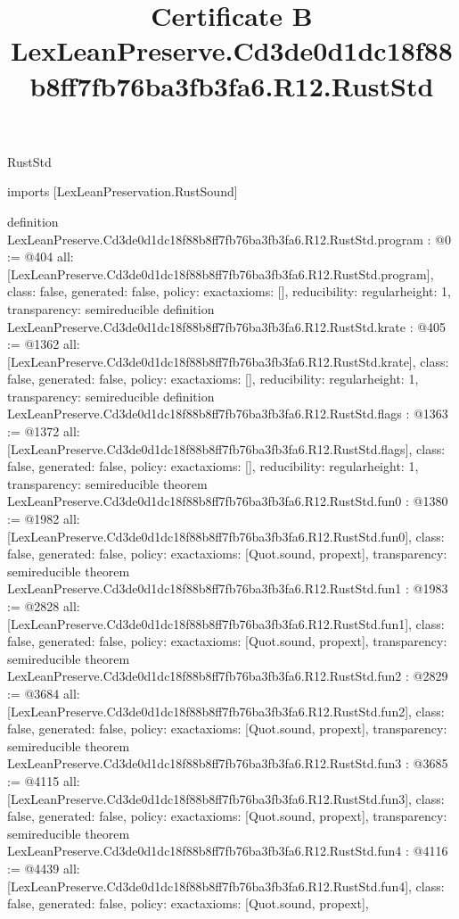 \begin{lexlean}{RustStd}
\title{Certificate B LexLeanPreserve.Cd3de0d1dc18f88b8ff7fb76ba3fb3fa6.R12.RustStd}
\begin{coremodule}
imports [LexLeanPreservation.RustSound]

definition LexLeanPreserve.Cd3de0d1dc18f88b8ff7fb76ba3fb3fa6.R12.RustStd.program : @0 := @404 {
  all: [LexLeanPreserve.Cd3de0d1dc18f88b8ff7fb76ba3fb3fa6.R12.RustStd.program],
  class: false,
  generated: false,
  policy: exact{axioms: []},
  reducibility: regular{height: 1},
  transparency: semireducible
}
definition LexLeanPreserve.Cd3de0d1dc18f88b8ff7fb76ba3fb3fa6.R12.RustStd.krate : @405 := @1362 {
  all: [LexLeanPreserve.Cd3de0d1dc18f88b8ff7fb76ba3fb3fa6.R12.RustStd.krate],
  class: false,
  generated: false,
  policy: exact{axioms: []},
  reducibility: regular{height: 1},
  transparency: semireducible
}
definition LexLeanPreserve.Cd3de0d1dc18f88b8ff7fb76ba3fb3fa6.R12.RustStd.flags : @1363 := @1372 {
  all: [LexLeanPreserve.Cd3de0d1dc18f88b8ff7fb76ba3fb3fa6.R12.RustStd.flags],
  class: false,
  generated: false,
  policy: exact{axioms: []},
  reducibility: regular{height: 1},
  transparency: semireducible
}
theorem LexLeanPreserve.Cd3de0d1dc18f88b8ff7fb76ba3fb3fa6.R12.RustStd.fun0 : @1380 := @1982 {
  all: [LexLeanPreserve.Cd3de0d1dc18f88b8ff7fb76ba3fb3fa6.R12.RustStd.fun0],
  class: false,
  generated: false,
  policy: exact{axioms: [Quot.sound, propext]},
  transparency: semireducible
}
theorem LexLeanPreserve.Cd3de0d1dc18f88b8ff7fb76ba3fb3fa6.R12.RustStd.fun1 : @1983 := @2828 {
  all: [LexLeanPreserve.Cd3de0d1dc18f88b8ff7fb76ba3fb3fa6.R12.RustStd.fun1],
  class: false,
  generated: false,
  policy: exact{axioms: [Quot.sound, propext]},
  transparency: semireducible
}
theorem LexLeanPreserve.Cd3de0d1dc18f88b8ff7fb76ba3fb3fa6.R12.RustStd.fun2 : @2829 := @3684 {
  all: [LexLeanPreserve.Cd3de0d1dc18f88b8ff7fb76ba3fb3fa6.R12.RustStd.fun2],
  class: false,
  generated: false,
  policy: exact{axioms: [Quot.sound, propext]},
  transparency: semireducible
}
theorem LexLeanPreserve.Cd3de0d1dc18f88b8ff7fb76ba3fb3fa6.R12.RustStd.fun3 : @3685 := @4115 {
  all: [LexLeanPreserve.Cd3de0d1dc18f88b8ff7fb76ba3fb3fa6.R12.RustStd.fun3],
  class: false,
  generated: false,
  policy: exact{axioms: [Quot.sound, propext]},
  transparency: semireducible
}
theorem LexLeanPreserve.Cd3de0d1dc18f88b8ff7fb76ba3fb3fa6.R12.RustStd.fun4 : @4116 := @4439 {
  all: [LexLeanPreserve.Cd3de0d1dc18f88b8ff7fb76ba3fb3fa6.R12.RustStd.fun4],
  class: false,
  generated: false,
  policy: exact{axioms: [Quot.sound, propext]},
}
\end{coremodule}
\end{lexlean}
